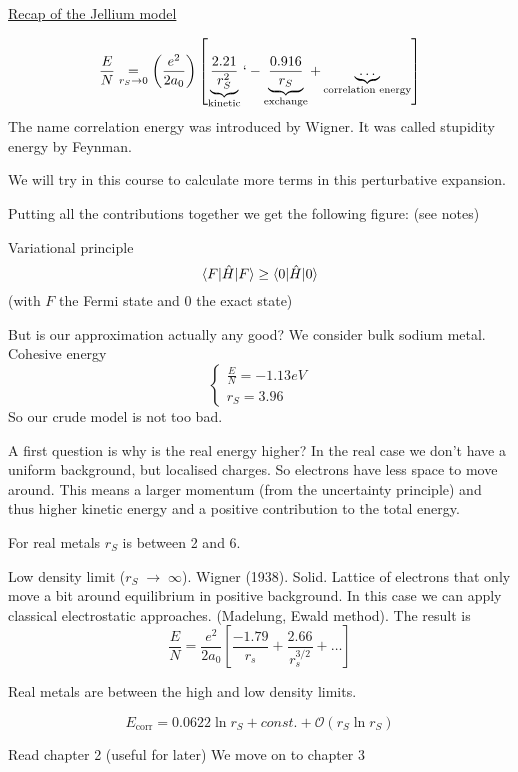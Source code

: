 \begin{params}
\underline{Recap of the Jellium model}

\[ \frac{E}{N} \underset{r_S \to 0}{=} \left(\frac{e^2}{2a_0}\right)\left[\underbrace{\frac{2.21}{r_S^2}}_{\text{kinetic}}`- \underbrace{\frac{0.916}{r_S}}_{\text{exchange}} + \underbrace{\ldots}_{\text{correlation energy}}\right] \]
The name correlation energy was introduced by Wigner. It was called stupidity energy by Feynman.

We will try in this course to calculate more terms in this perturbative expansion.

Putting all the contributions together we get the following figure: (see notes)

Variational principle
\[ \braket[\hat{H}]{F}{F} \geq \braket[\hat{H}]{0}{0} \]
(with $F$ the Fermi state and $0$ the exact state)

But is our approximation actually any good? We consider bulk sodium metal. Cohesive energy
\[ \begin{cases}
\frac{E}{N} = - 1.13 eV \\
r_S = 3.96
\end{cases} \] 
So our crude model is not too bad.

A first question is why is the real energy higher? In the real case we don't have a uniform background, but localised charges. So electrons have less space to move around. This means a larger momentum (from the uncertainty principle) and thus higher kinetic energy and a positive contribution to the total energy.

For real metals $r_S$ is between 2 and 6.

Low density limit ($r_S \; \to \; \infty$). Wigner (1938). Solid. Lattice of electrons that only move a bit around equilibrium in positive background. In this case we can apply classical electrostatic approaches. (Madelung, Ewald method). The result is
\[ \frac{E}{N} = \frac{e^2}{2a_0} \left[\frac{-1.79}{r_s}+ \frac{2.66}{r_s^{3/2}} + \ldots\right] \] 

Real metals are between the high and low density limits.

\[ E_\text{corr} = 0.0622 \ln r_S + const. + \mathcal{O}(r_S \ln r_S) \]

\end{params}

Read chapter 2 (useful for later)
We move on to chapter 3

